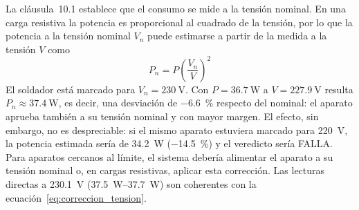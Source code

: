La cláusula~10.1 establece que el consumo se mide a la tensión nominal. En una
carga resistiva la potencia es proporcional al cuadrado de la tensión, por lo que
la potencia a la tensión nominal $V_n$ puede estimarse a partir de la medida a la
tensión $V$ como
\begin{equation}
    P_n = P \left(\frac{V_n}{V}\right)^2
    \label{eq:correccion_tension}
\end{equation}
El soldador está marcado para $V_n = \SI{230}{\volt}$. Con
$P = \SI{36,7}{\watt}$ a $V = \SI{227,9}{\volt}$ resulta
$P_n \approx \SI{37,4}{\watt}$, es decir, una desviación de \SI{-6,6}{\percent}
respecto del nominal: el aparato aprueba también a su tensión nominal y con mayor
margen. El efecto, sin embargo, no es despreciable: si el mismo aparato estuviera
marcado para \SI{220}{\volt}, la potencia estimada sería de \SI{34,2}{\watt}
(\SI{-14,5}{\percent}) y el veredicto sería FALLA. Para aparatos cercanos al
límite, el sistema debería alimentar el aparato a su tensión nominal o, en cargas
resistivas, aplicar esta corrección. Las lecturas directas a \SI{230,1}{\volt}
(\SIrange{37,5}{37,7}{\watt}) son coherentes con la
ecuación~\eqref{eq:correccion_tension}.
